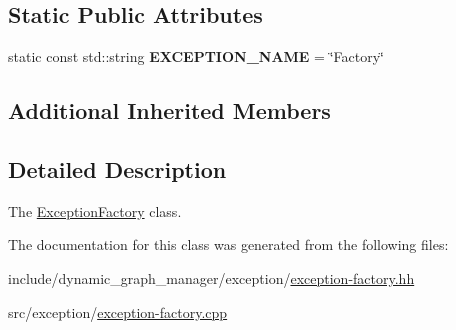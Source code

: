\subsection*{Static Public Attributes}
\begin{DoxyCompactItemize}
\item 
\mbox{\label{classdynamic__graph_1_1ExceptionFactory_a7fe66d9197d860bd55f3a9676fa489b1}} 
static const std\+::string {\bfseries E\+X\+C\+E\+P\+T\+I\+O\+N\+\_\+\+N\+A\+ME} = \char`\"{}Factory\char`\"{}
\end{DoxyCompactItemize}
\subsection*{Additional Inherited Members}


\subsection{Detailed Description}
The \hyperlink{classdynamic__graph_1_1ExceptionFactory}{Exception\+Factory} class. 

The documentation for this class was generated from the following files\+:\begin{DoxyCompactItemize}
\item 
include/dynamic\+\_\+graph\+\_\+manager/exception/\hyperlink{exception-factory_8hh}{exception-\/factory.\+hh}\item 
src/exception/\hyperlink{exception-factory_8cpp}{exception-\/factory.\+cpp}\end{DoxyCompactItemize}

